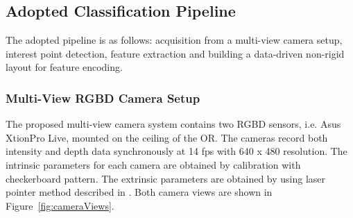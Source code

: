 \documentclass[a4paper, 10pt, conference]{ieeeconf}      %
\begin{document}

\subsection{Adopted Classification Pipeline \cite{c1}}
\label{section:AdoptedClassificationPipeline}
The adopted pipeline \cite{c1} is as follows: acquisition from a multi-view camera setup, interest point detection, feature extraction and building a data-driven non-rigid layout for feature encoding.

\subsubsection{Multi-View RGBD Camera Setup}
\label{section:MultiViewRGBDCameraSetup}
    The proposed multi-view camera system contains two RGBD sensors, i.e. Asus XtionPro Live, mounted on the ceiling of the OR. The cameras record both intensity and depth data synchronously at 14 fps with 640 x 480 resolution. 
    The intrinsic parameters for each camera are obtained by calibration with checkerboard pattern. The extrinsic parameters are obtained  by using laser pointer method described in \cite{c27}. Both camera views are shown in Figure~\ref{fig:cameraViews}.
    
\end{document}
